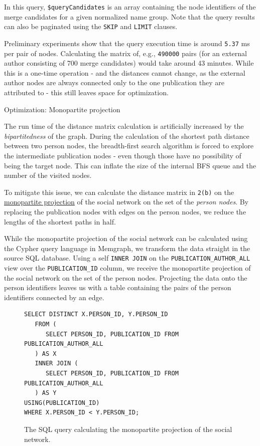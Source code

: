 In this query, \texttt{\$queryCandidates} is an array containing the node identifiers of the merge candidates for a given normalized name group.
Note that the query results can also be paginated using the \texttt{SKIP} and \texttt{LIMIT} clauses.

Preliminary experiments show that the query execution time is around \texttt{5.37} ms per pair of nodes.
Calculating the matrix of, e.g., \texttt{490000} pairs (for an external author consisting of 700 merge candidates) would take around 43 minutes.
While this is a one-time operation - and the distances cannot change, as the external author nodes are always connected only to the one publication they are attributed to - this still leaves space for optimization.

\begin{mybox}
    {Optimization: Monopartite projection}

    The run time of the distance matrix calculation is artificially increased by the \textit{bipartitedness} of the graph.
    During the calculation of the shortest path distance between two person nodes, 
    the breadth-first search algorithm is forced to explore the intermediate publication nodes - even though those have no possibility of being the target node.
    This can inflate the size of the internal BFS queue and the number of the visited nodes.
    
    To mitigate this issue, we can calculate the distance matrix in \texttt{2(b)} on the \hyperref[def:monopartite-projection]{monopartite projection} of the social network on 
    the set of the \textit{person nodes}. By replacing the publication nodes with edges on the person nodes, we reduce the lengths of the shortest paths in half.
\end{mybox}

While the monopartite projection of the social network can be calculated using the Cypher query language in Memgraph,
we transform the data straight in the source SQL database. Using a self \texttt{INNER JOIN} on the \texttt{PUBLICATION\_AUTHOR\_ALL} view over the \texttt{PUBLICATION\_ID} column,
we receive the monopartite projection of the social network on the set of the person nodes. Projecting the data onto the person identifiers
leaves us with a table containing the pairs of the person identifiers connected by an edge.

\begin{figure}[!ht]
\begin{verbatim}
SELECT DISTINCT X.PERSON_ID, Y.PERSON_ID 
   FROM (
      SELECT PERSON_ID, PUBLICATION_ID FROM PUBLICATION_AUTHOR_ALL
   ) AS X 
   INNER JOIN (
      SELECT PERSON_ID, PUBLICATION_ID FROM PUBLICATION_AUTHOR_ALL
   ) AS Y 
USING(PUBLICATION_ID)
WHERE X.PERSON_ID < Y.PERSON_ID;
\end{verbatim}
\captionsetup{width=.9\linewidth}
\caption{The SQL query calculating the monopartite projection of the social network.}
\label{fig:monopartite-projection}
\end{figure}

